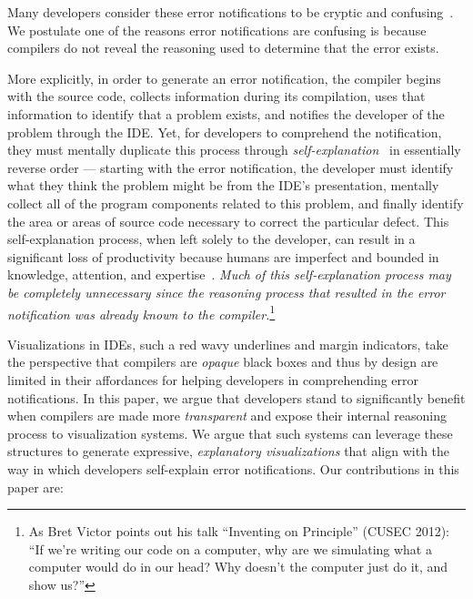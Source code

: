 \documentclass[conference]{IEEEtran}
\begin{document}

Many developers consider these error notifications to be cryptic and confusing~\cite{Traver2010}. We postulate one of the reasons error notifications are confusing is because compilers do not reveal the reasoning used to determine that the error exists.

More explicitly, in order to generate an error notification, the compiler begins with the source code, collects information during its compilation, uses that information to identify that a problem exists, and notifies the developer of the problem through the IDE. Yet, for developers to comprehend the notification, they must mentally duplicate this process through \textit{self-explanation}~\cite{Parnin2011} in essentially reverse order --- starting with the error notification, the developer must identify what they think the problem might be from the IDE's presentation, mentally collect all of the program components related to this problem, and finally identify the area or areas of source code necessary to correct the particular defect. This self-explanation process, when left solely to the developer, can result in a significant loss of productivity because humans are imperfect and bounded in knowledge, attention, and expertise~\cite{Ko2005}. \textit{Much of this self-explanation process may be completely unnecessary since the reasoning process that resulted in the error notification was already known to the compiler.}\footnote{As Bret Victor points out his talk ``Inventing on Principle'' (CUSEC 2012): ``If we're writing our code on a computer, why are we simulating what a computer would do in our head? Why doesn't the computer just do it, and show us?''}

Visualizations in IDEs, such a red wavy underlines and margin indicators, take the perspective that compilers are \textit{opaque} black boxes and thus by design are limited in their affordances for helping developers in comprehending error notifications. In this paper, we argue that developers stand to significantly benefit when compilers are made more \textit{transparent} and expose their internal reasoning process to visualization systems. We argue that such systems can leverage these structures to generate expressive, \textit{explanatory visualizations} that align with the way in which developers self-explain error notifications. Our contributions in this paper are:
\end{document}
